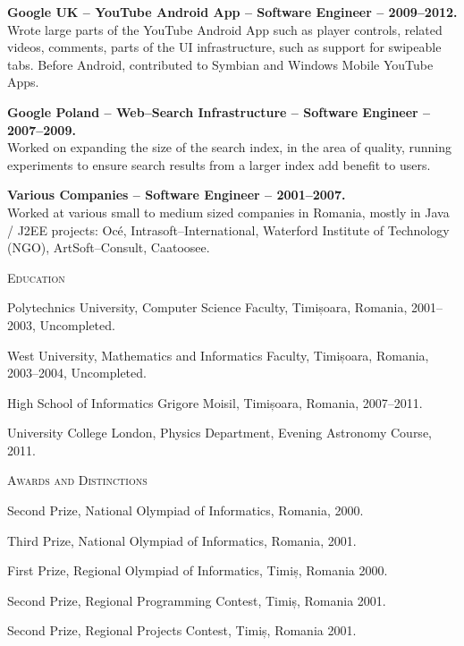 \documentclass[11pt]{article}
\begin{document}
\begin{list}{}{\leftmargin=0em}
\item
{\bf Google UK -- YouTube Android App -- Software Engineer -- 2009--2012.}\\
Wrote large parts of the YouTube Android App such as player controls, related videos, comments, parts of the UI 
infrastructure, such as support for swipeable tabs.
Before Android, contributed to Symbian and Windows Mobile YouTube Apps.

\item
{\bf Google Poland -- Web--Search Infrastructure -- Software Engineer -- 2007--2009.}\\
Worked on expanding the size of the search index, in the area of quality, running experiments to ensure
search results from a larger index add benefit to users.

\newpage

\item
{\bf Various Companies -- Software Engineer -- 2001--2007.}\\
Worked at various small to medium sized companies in Romania, mostly in Java / J2EE projects:
Oc\'e, Intrasoft--International, Waterford Institute of Technology (NGO), ArtSoft--Consult, Caatoosee.

\end{list}

\vspace{0.12in}

\noindent
\textcolor{Primary}{{\large \textsc{Education}}}
\begin{list}{}{\leftmargin=0em}
  \setlength{\itemsep}{1pt}
  \setlength{\parskip}{0pt}
  \setlength{\parsep}{0pt}
  \item Polytechnics University, Computer Science Faculty, Timișoara, Romania, 2001--2003, Uncompleted.
  \item West University, Mathematics and Informatics Faculty, Timișoara, Romania, 2003--2004, Uncompleted.
  \item High School of Informatics Grigore Moisil, Timișoara, Romania, 2007--2011.
  \item University College London, Physics Department, Evening Astronomy Course, 2011.
\end{list}

\vspace{0.12in}

\noindent
\textcolor{Primary}{{\large \textsc{Awards and Distinctions}}}
\begin{list}{}{\leftmargin=0em}
  \setlength{\itemsep}{1pt}
  \setlength{\parskip}{0pt}
  \setlength{\parsep}{0pt}
  \item{Second Prize, National Olympiad of Informatics, Romania, 2000.}
  \item{Third Prize, National Olympiad of Informatics, Romania, 2001.}
  \item{First Prize, Regional Olympiad of Informatics, Timiș, Romania 2000.}
  \item{Second Prize, Regional Programming Contest, Timiș, Romania 2001.}
  \item{Second Prize, Regional Projects Contest, Timiș, Romania 2001.}
\end{list}
\end{document}
